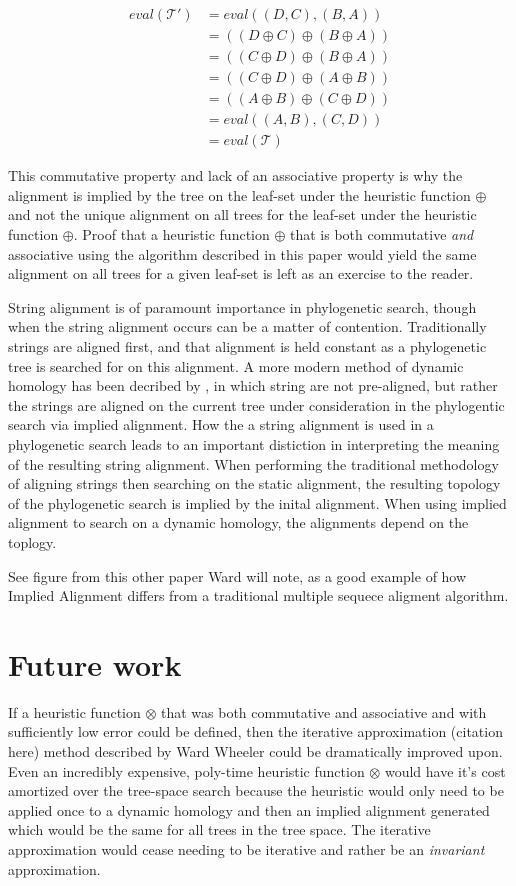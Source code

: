 \documentclass[11pt]{article}
\begin{document}
\begin{align*}
  eval(\mathcal{T'}) &= eval((D,C),(B,A))
\\  &= ((D \oplus C) \oplus (B \oplus A))
\\  &= ((C \oplus D) \oplus (B \oplus A))
\\  &= ((C \oplus D) \oplus (A \oplus B))
\\  &= ((A \oplus B) \oplus (C \oplus D))
\\  &= eval((A,B),(C,D))
\\  &= eval(\mathcal{T})
\end{align*}

This commutative property and lack of an associative property is why the alignment is implied by the tree on the leaf-set under the heuristic function $\oplus$ and not the unique alignment on all trees for the leaf-set under the heuristic function $\oplus$. 
Proof that a heuristic function $\oplus$ that is both commutative \emph{and} associative using the algorithm described in this paper would yield the same alignment on all trees for a given leaf-set is left as an exercise to the reader.

String alignment is of paramount importance in phylogenetic search, though when the string alignment occurs can be a matter of contention.
Traditionally strings are aligned first, and that alignment is held constant as a phylogenetic tree is searched for on this alignment.
A more modern method of dynamic homology has been decribed by \citep{Wheeler2001}, in which string are not pre-aligned, but rather the strings are aligned on the current tree under consideration in the phylogentic search via implied alignment.
How the a string alignment is used in a phylogenetic search leads to an important distiction in interpreting the meaning of the resulting string alignment.
When performing the traditional methodology of aligning strings then searching on the static alignment, the resulting topology of the phylogenetic search is implied by the inital alignment.
When using implied alignment to search on a dynamic homology, the alignments depend on the toplogy.

See figure from this other paper Ward will note, as a good example of how Implied Alignment differs from a traditional multiple sequece aligment algorithm.


\section{Future work}
If a heuristic function $\otimes$ that was both commutative and associative and with sufficiently low error could be defined, then the iterative approximation (citation here) method described by Ward Wheeler could be dramatically improved upon. 
Even an incredibly expensive, poly-time heuristic function $\otimes$ would have it's cost amortized over the tree-space search because the heuristic would only need to be applied once to a dynamic homology and then an implied alignment generated which would be the same for all trees in the tree space. 
The iterative approximation would cease needing to be iterative and rather be an \emph{invariant} approximation.
\end{document}
